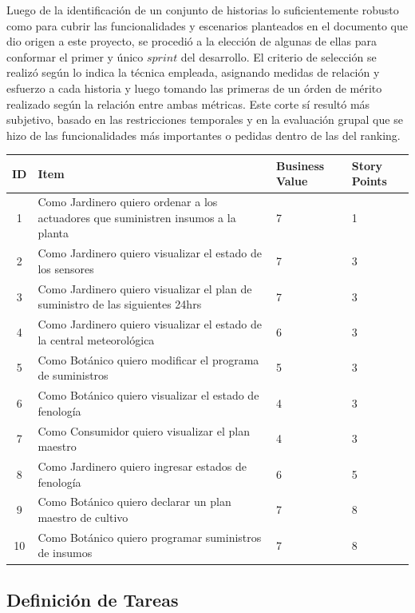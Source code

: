 Luego de la identificación de un conjunto de historias lo suficientemente robusto como para cubrir las funcionalidades y escenarios planteados en el documento que dio origen a este proyecto, se procedió a la elección de algunas de ellas para conformar el primer y único $sprint$ del desarrollo. El criterio de selección se realizó según lo indica la técnica empleada, asignando medidas de relación y esfuerzo a cada historia y luego tomando las primeras de un órden de mérito realizado según la relación entre ambas métricas. Este corte sí resultó más subjetivo, basado en las restricciones temporales y en la evaluación grupal que se hizo de las funcionalidades más importantes o pedidas dentro de las del ranking.

\begin{center}
    \begin{tabular}{ | c | p{5cm} | l | l |}
    \hline
    ID & Item & Business Value & Story Points \\ \hline
1 & Como Jardinero quiero ordenar a los actuadores que suministren insumos a la planta	& 7	& 1	\\ \hline
2 & Como Jardinero quiero visualizar el estado de los sensores	& 7 &	3 \\ \hline
3 & Como Jardinero quiero visualizar el plan de suministro de las siguientes 24hrs	& 7	& 3 \\ \hline
4 & Como Jardinero quiero visualizar el estado de la central meteorológica	& 6	& 3 \\ \hline
5 & Como Botánico quiero modificar el programa de suministros &	5	& 3 \\ \hline
6 & Como Botánico quiero visualizar el estado de fenología	& 4	& 3 \\ \hline
7 & Como Consumidor quiero visualizar el plan maestro	& 4	& 3 \\ \hline
8 & Como Jardinero quiero ingresar estados de fenología	& 6	& 5 \\ \hline
9 & Como Botánico quiero declarar un plan maestro de cultivo	& 7	& 8 \\ \hline
10 & Como Botánico quiero programar suministros de insumos	& 7	& 8 \\ \hline
    \end{tabular}
\end{center}

\subsection{Definición de Tareas}


